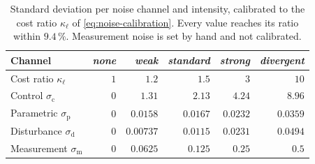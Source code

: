\begin{table}[htbp]
\centering
\caption{Standard deviation per noise channel and intensity, calibrated to the cost ratio $\kappa_{\ell}$ of \eqref{eq:noise-calibration}. Every value reaches its ratio within $9.4\,\%$. Measurement noise is set by hand and not calibrated.}
\label{tab:pixel-noise-levels}
\begin{tabular}{@{}lrrrrr@{}}
\toprule
Channel & \emph{none} & \emph{weak} & \emph{standard} & \emph{strong} & \emph{divergent} \\
\midrule
Cost ratio $\kappa_{\ell}$ & $1$ & $1.2$ & $1.5$ & $3$ & $10$ \\
\midrule
Control $\sigma_{\mathrm{c}}$ & $0$ & $1.31$ & $2.13$ & $4.24$ & $8.96$ \\
Parametric $\sigma_{\mathrm{p}}$ & $0$ & $0.0158$ & $0.0167$ & $0.0232$ & $0.0359$ \\
Disturbance $\sigma_{\mathrm{d}}$ & $0$ & $0.00737$ & $0.0115$ & $0.0231$ & $0.0494$ \\
Measurement $\sigma_{\mathrm{m}}$ & $0$ & $0.0625$ & $0.125$ & $0.25$ & $0.5$ \\
\bottomrule
\end{tabular}
\end{table}
